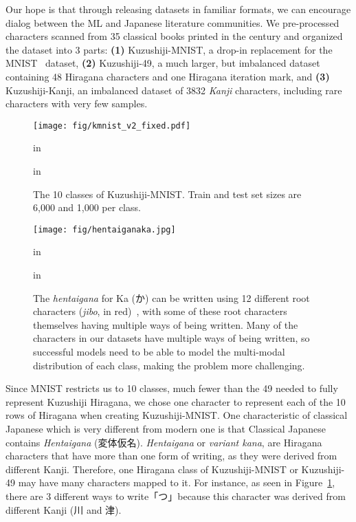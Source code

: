 \documentclass{article}
\begin{document}
\begin{CJK}{UTF8}{min}
Our hope is that through releasing datasets in familiar formats, we can encourage dialog between the ML and Japanese literature communities. We pre-processed characters scanned from 35 classical books printed in the  century and organized the dataset into 3 parts: \textbf{(1)} Kuzushiji-MNIST, a drop-in replacement for the MNIST~\cite{lecun1998mnist} dataset, \textbf{(2)} Kuzushiji-49, a much larger, but imbalanced dataset containing 48 Hiragana characters and one Hiragana iteration mark, and \textbf{(3)} Kuzushiji-Kanji, an imbalanced dataset of 3832 \textit{Kanji} characters, including rare characters with very few samples.

\begin{figure}[!htb]
\vskip -0.05in
\begin{center}
\centerline{\texttt{[image: fig/kmnist\_v2\_fixed.pdf]}}
 in
\caption{The 10 classes of Kuzushiji-MNIST. Train and test set sizes are 6,000 and 1,000 per class.}
\label{fig:kmnist_description}
\end{center}
 in
\end{figure}

\begin{figure}[!htb]
\vskip -0.05in
\begin{center}
\centerline{\texttt{[image: fig/hentaiganaka.jpg]}}
 in
\caption{The \textit{hentaigana} for Ka (か) can be written using 12 different root characters (\textit{jibo}, in red)~\cite{kuzushijidict}, with some of these root characters themselves having multiple ways of being written. Many of the characters in our datasets have multiple ways of being written, so successful models need to be able to model the multi-modal distribution of each class, making the problem more challenging.}\label{fig:hentaiganaka}
\end{center}
 in
\end{figure}

Since MNIST restricts us to 10 classes, much fewer than the 49 needed to fully represent Kuzushiji Hiragana, we chose one character to represent each of the 10 rows of Hiragana when creating Kuzushiji-MNIST. One characteristic of classical Japanese which is very different from modern one is that Classical Japanese contains \textit{Hentaigana} (変体仮名). \textit{Hentaigana} or \textit{variant kana}, are Hiragana characters that have more than one form of writing, as they were derived from different Kanji. Therefore, one Hiragana class of Kuzushiji-MNIST or Kuzushiji-49 may have many characters mapped to it. For instance, as seen in Figure~\ref{fig:kmnist_description}, there are 3 different ways to write「つ」because this character was derived from different Kanji (川 and 津).


\end{CJK}
\end{document}
